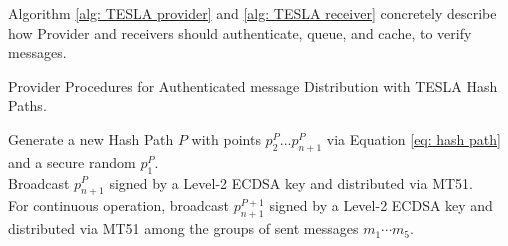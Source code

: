 \documentclass[letterpaper,times]{IONconf/IONconf}
\begin{document}
Algorithm \ref{alg: TESLA provider} and \ref{alg: TESLA receiver} concretely describe how Provider and receivers should authenticate, queue, and cache, to verify messages.
\begin{algorithm}
	\caption{Provider Procedures for Authenticated message Distribution with TESLA Hash Paths.}
	\label{alg: TESLA provider}
	\SetAlgoLined
	Generate a new Hash Path $P$ with points $p^P_2 ... p^P_{n+1}$ via Equation \eqref{eq: hash path} and a secure random $p^P_1$. \\
	Broadcast $p^P_{n+1}$ signed by a Level-2 ECDSA key and distributed via MT51. \\
	For continuous operation, broadcast $p^{P+1}_{n+1}$ signed by a Level-2 ECDSA key and distributed via MT51 among the groups of sent messages $m_1 \cdots m_5$. \\
\end{algorithm}
\end{document}
